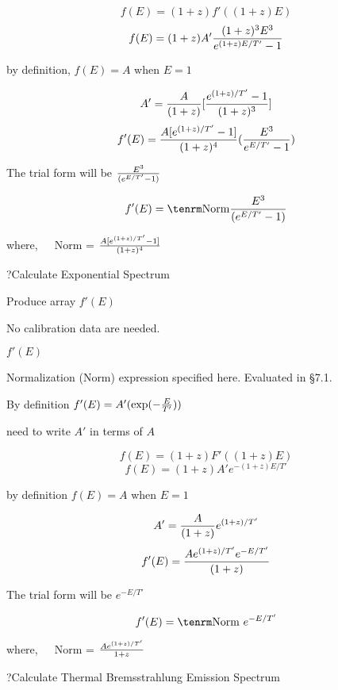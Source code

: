 $$f(E) = (1+z)f'((1+z)E)$$
$$f(E) = (1+z)A'{(1+z)^3 E^3 \over e^{(1+z)E/T'}-1}$$
 
\itemitem{}by definition, $f(E) = A$ when $E = 1$

$$A' = {A\over (1+z)} [{e^{(1+z)/T'}-1\over (1+z)^{3}}]$$
$$f'(E) = {A[e^{(1+z)/T'}-1]\over (1+z)^{4}} ({E^{3}\over e^{E/T'}-1})$$
 
\itemitem{}The trial form will be ${E^{3}\over (e^{E/T'}-1)}$

$$f'(E) = {\rm Norm} {E^{3}\over (e^{E/T'}-1)}$$
 
\itemitem{}where,~~~Norm = ${A[e^{(1+z)/T'}-1]\over (1+z)^{4}}$

\??Calculate Exponential Spectrum

{\listlist


Produce array $f'(E)$


}

{\parindent \vbox{}}

{\listlist
 
No calibration data are needed.

 
$f'(E)$

Normalization (Norm) expression specified here. Evaluated in \S7.1.

 
By definition $f'(E) = A'(\exp(-{E\over T'}))$

need to write $A'$ in terms of $A$

}

$$f(E) = (1+z)F'((1+z)E)$$
$$f(E) = (1+z)A'e^{-(1+z)E/T'}$$

\itemitem{}by definition $f(E) = A$ when $E = 1$

$$A' = {A\over (1+z)} e^{(1+z)/T'}$$
$$f'(E) = {A e^{(1+z)/T'} e^{-E/T'}\over (1+z)}$$

\itemitem{}The trial form will be $e^{-E/T'}$

$$f'(E) = {\rm Norm}~e^{-E/T'}$$

\itemitem{}where,~~~Norm = ${A e^{(1+z)/T'}\over 1+z}$

\??Calculate Thermal Bremsstrahlung Emission Spectrum

